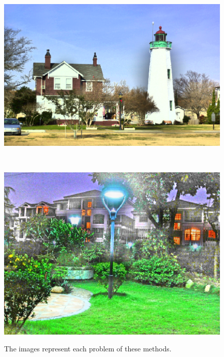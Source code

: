 \begin{figure}[tb]
	\begin{minipage}[b]{1.0\hsize}
		\centering
		\includegraphics[width=0.65\hsize]{images/problems/srie/reflectance.eps}
		 \label{fig:problem/srie/reflectance}
	\end{minipage}\\
	\begin{minipage}[b]{1.0\hsize}
		\centering
		\includegraphics[width=0.65\hsize]{images/problems/jiep/reflectance.eps}
		 \label{fig:problem/jiep/reflectance}
	\end{minipage}
	\caption{The images represent each problem of these methods.}
	\label{fig:problems}
\end{figure}